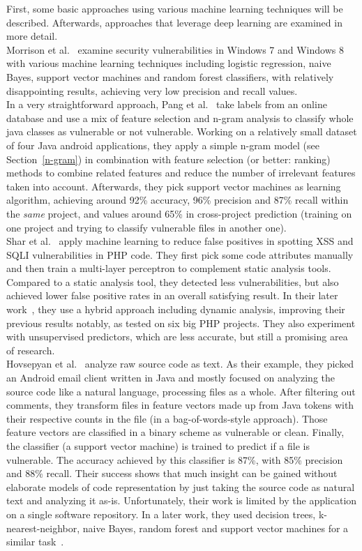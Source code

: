 \documentclass[
a4paper,
pagesize,
pdftex,
12pt,
ngerman,
fleqn,
final,
]{scrartcl}
\begin{document}
	First, some basic approaches using various machine learning techniques will be described. Afterwards, approaches that leverage deep learning are examined in more detail.\\
	Morrison et al.~\cite{Morrison.2015} examine security vulnerabilities in Windows 7 and Windows 8 with various machine learning techniques including logistic regression, naive Bayes, support vector machines and random forest classifiers, with relatively disappointing results, achieving very low precision and recall values.\\
	In a very straightforward approach, Pang et al.~\cite{Pang.2015} take labels from an online database and use a mix of feature selection and n-gram analysis to classify whole java classes as vulnerable or not vulnerable. Working on a relatively small dataset of four Java android applications, they apply a simple n-gram model (see Section~\ref{n-gram}) in combination with feature selection (or better: ranking) methods to combine related features and reduce the number of irrelevant features taken into account. Afterwards, they pick support vector machines as learning algorithm, achieving around 92\% accuracy, 96\% precision and 87\% recall within the \textit{same} project, and values around 65\% in cross-project prediction (training on one project and trying to classify vulnerable files in another one).\\
	Shar et al.~\cite{Shar.2013b} apply machine learning to reduce false positives in spotting XSS and SQLI vulnerabilities in PHP code. They first pick some code attributes manually and then train a multi-layer perceptron to complement static analysis tools. Compared to a static analysis tool, they detected less vulnerabilities, but also achieved lower false positive rates in an overall satisfying result. In their later work~\cite{Shar.2013}, they use a hybrid approach including dynamic analysis, improving their previous results notably, as tested on six big PHP projects. They also experiment with unsupervised predictors, which are less accurate, but still a promising area of research. \\
	Hovsepyan et al.~\cite{Hovsepyan.2012} analyze raw source code as text. As their example, they picked an Android email client written in Java and mostly focused on analyzing the source code like a natural language, processing files as a whole. After filtering out comments, they transform files in feature vectors made up from Java tokens with their respective counts in the file (in a bag-of-words-style approach). Those feature vectors are classified in a binary scheme as vulnerable or clean. Finally, the classifier (a support vector machine) is trained to predict if a file is vulnerable. The accuracy achieved by this classifier is 87\%, with 85\% precision and 88\% recall. Their success shows that much insight can be gained without elaborate models of code representation by just taking the source code as natural text and analyzing it as-is. Unfortunately, their work is limited by the application on a single software repository. In a later work, they used decision trees, k-nearest-neighbor, naive Bayes, random forest and support vector machines for a similar task~\cite{Scandariato.2014}.\\
	
\end{document}
